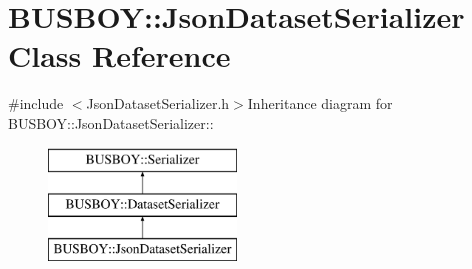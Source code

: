 \hypertarget{classBUSBOY_1_1JsonDatasetSerializer}{
\section{BUSBOY::JsonDatasetSerializer Class Reference}
\label{classBUSBOY_1_1JsonDatasetSerializer}
}


{\ttfamily \#include $<$JsonDatasetSerializer.h$>$}Inheritance diagram for BUSBOY::JsonDatasetSerializer::\begin{figure}[H]
\begin{center}
\leavevmode
\includegraphics[height=3cm]{classBUSBOY_1_1JsonDatasetSerializer}
\end{center}
\end{figure}

